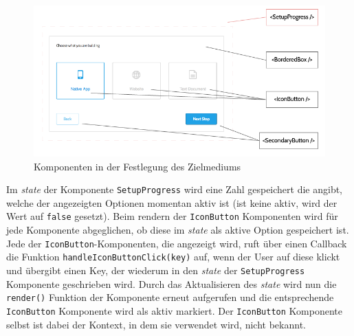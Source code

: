 \begin{figure}[h]
    \centering
    \includegraphics[width=1\textwidth]{images/components.png}
    \caption{Komponenten in der Festlegung des Zielmediums}
    \label{fig:components}
\end{figure}


Im \textit{state} der Komponente \texttt{SetupProgress} wird eine Zahl gespeichert die angibt, welche der angezeigten Optionen momentan aktiv ist (ist keine aktiv, wird der Wert auf \texttt{false} gesetzt). Beim rendern der \texttt{IconButton} Komponenten wird für jede Komponente abgeglichen, ob diese im \textit{state} als aktive Option gespeichert ist. Jede der \texttt{IconButton}-Komponenten, die angezeigt wird, ruft über einen Callback die Funktion \texttt{handle\-Icon\-Button\-Click\-(key)} auf, wenn der User auf diese klickt und übergibt einen Key, der wiederum in den \textit{state} der  \texttt{SetupProgress} Komponente geschrieben wird. Durch das Aktualisieren des \textit{state} wird nun die \texttt{render()} Funktion der Komponente erneut aufgerufen und die entsprechende \texttt{IconButton} Komponente wird als aktiv markiert.
Der  \texttt{IconButton} Komponente selbst ist dabei der Kontext, in dem sie verwendet wird, nicht bekannt.


